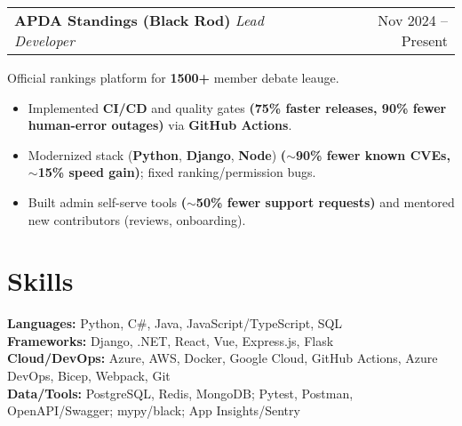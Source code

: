 \documentclass[11pt]{article}
\makeatletter
\newcommand{\BulletSize}{10}
\newcommand{\BulletLead}{12}
\newcommand{\BlurbSize}{10}
\newcommand{\BlurbLead}{12}
\newcommand{\BlurbPre}{0pt}
\newcommand{\BlurbPost}{-8pt}
\newcommand{\SkillsSize}{10}
\newcommand{\SkillsLead}{12}
\newcommand{\SkillsLabelWeight}{\bfseries}
\newenvironment{twocol}[2]{%
  \noindent\begin{tabular*}{\textwidth}{@{\extracolsep{\fill}} l r}
  #1 & #2\\
  \end{tabular*}\ignorespaces
}{\par}
\newenvironment{ResumeItemize}{%
  \begin{itemize}\fontsize{\BulletSize}{\BulletLead}\selectfont
}{%
  \end{itemize}
}
\newcommand{\ProjectBlurb}[1]{%
  \vspace*{\BlurbPre}%
  {\fontsize{\BlurbSize}{\BlurbLead}\selectfont #1}%
  \\[\BlurbPost]%
}
\newcommand{\SkillsLine}[2]{%
  {\fontsize{\SkillsSize}{\SkillsLead}\selectfont \SkillsLabelWeight #1: }%
  {\fontsize{\SkillsSize}{\SkillsLead}\selectfont #2}\\
}
\makeatother
\begin{document}
\begin{twocol}{\textbf{APDA Standings (Black Rod)} \;\textit{Lead Developer}}{Nov 2024 -- Present}\end{twocol}
\ProjectBlurb{Official rankings platform for \textbf{1500+} member debate leauge.}
\begin{ResumeItemize}
  \item Implemented \textbf{CI/CD} and quality gates \textbf{(75\% faster releases, 90\% fewer human-error outages)} via \textbf{GitHub Actions}.
  \item Modernized stack (\textbf{Python}, \textbf{Django}, \textbf{Node}) \textbf{(\(\sim\)90\% fewer known CVEs, \(\sim\)15\% speed gain)}; fixed ranking/permission bugs.
  \item Built admin self-serve tools \textbf{(\(\sim\)50\% fewer support requests)} and mentored new contributors (reviews, onboarding).
\end{ResumeItemize}
\section{Skills}
\SkillsLine{Languages}{Python, C\#, Java, JavaScript/TypeScript, SQL}
\SkillsLine{Frameworks}{Django, .NET, React, Vue, Express.js, Flask}
\SkillsLine{Cloud/DevOps}{Azure, AWS, Docker, Google Cloud, GitHub Actions, Azure DevOps, Bicep, Webpack, Git}
\SkillsLine{Data/Tools}{PostgreSQL, Redis, MongoDB; Pytest, Postman, OpenAPI/Swagger; mypy/black; App Insights/Sentry}
\enlargethispage{\footskip}
\end{document}
